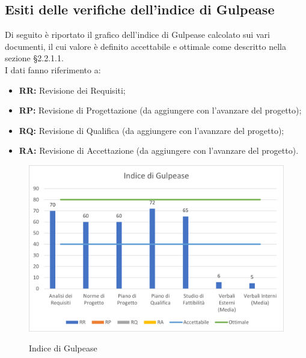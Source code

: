 \subsection{Esiti delle verifiche dell'indice di Gulpease}
Di seguito è riportato il grafico dell'indice di Gulpease calcolato sui vari documenti, il cui valore è definito accettabile e ottimale come descritto nella sezione §2.2.1.1.\\
I dati fanno riferimento a:
\begin{itemize}
	\item \textbf{RR:} Revisione dei Requisiti;
	\item \textbf{RP:} Revisione di Progettazione (da aggiungere con l'avanzare del progetto);
	\item \textbf{RQ:} Revisione di Qualifica (da aggiungere con l'avanzare del progetto);
	\item \textbf{RA:} Revisione di Accettazione (da aggiungere con l'avanzare del progetto).
\end{itemize} 

\begin{figure}[H]
\centering
\includegraphics[scale=0.90]{res/ResocontoAttivitaDiVerifica/res/img/indiceGulpease.png}\\
\caption{Indice di Gulpease}
\end{figure}

